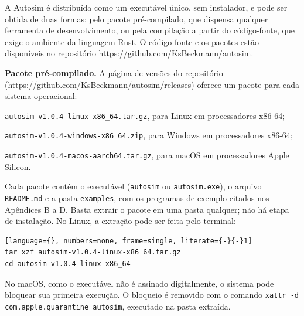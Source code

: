 \documentclass[
    12pt
    ,oneside
    ,a4paper
    ,chapter=TITLE
    ,section=TITLE
    ,sumario=abnt-6027-2012]{abntex2}
\begin{document}
\postextual






A Autosim é distribuída como um executável único, sem instalador, e pode ser obtida de
duas formas: pelo pacote pré-compilado, que dispensa qualquer ferramenta de
desenvolvimento, ou pela compilação a partir do código-fonte, que exige o ambiente da
linguagem Rust. O código-fonte e os pacotes estão disponíveis no repositório
\url{https://github.com/KsBeckmann/autosim}.

\textbf{Pacote pré-compilado.} A página de versões do repositório
(\url{https://github.com/KsBeckmann/autosim/releases}) oferece um pacote para cada sistema
operacional:

\begin{alineas}
    \item \texttt{autosim-v1.0.4-linux-x86\_64.tar.gz}, para Linux em processadores x86-64;
    \item \texttt{autosim-v1.0.4-windows-x86\_64.zip}, para Windows em processadores x86-64;
    \item \texttt{autosim-v1.0.4-macos-aarch64.tar.gz}, para macOS em processadores Apple
    Silicon.
\end{alineas}

Cada pacote contém o executável (\texttt{autosim} ou \texttt{autosim.exe}), o arquivo
\texttt{README.md} e a pasta \texttt{examples}, com os programas de exemplo citados nos
Apêndices B a D. Basta extrair o pacote em uma pasta qualquer; não há etapa de
instalação. No Linux, a extração pode ser feita pelo terminal:

\begin{lstlisting}[language={}, numbers=none, frame=single, literate={-}{-}1]
tar xzf autosim-v1.0.4-linux-x86_64.tar.gz
cd autosim-v1.0.4-linux-x86_64
\end{lstlisting}

No macOS, como o executável não é assinado digitalmente, o sistema pode bloquear sua
primeira execução. O bloqueio é removido com o comando
\texttt{xattr -d com.apple.quarantine autosim}, executado na pasta extraída.
\end{document}
